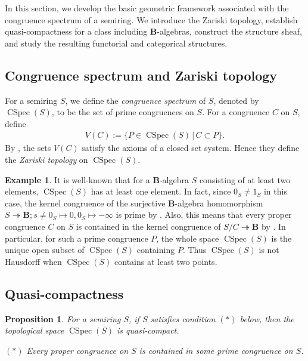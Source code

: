 \documentclass[a4paper,12pt]{amsart}
\theoremstyle{plain}
\newtheorem{proposition}[theorem]{Proposition}
\theoremstyle{definition}
\newtheorem{example}[theorem]{Example}
\begin{document}
In this section, we develop the basic geometric framework associated with the congruence spectrum of a semiring.
We introduce the Zariski topology, establish quasi-compactness for a class including $\boldsymbol{B}$-algebras, construct the structure sheaf, and study the resulting functorial and categorical structures.

\subsection{Congruence spectrum and Zariski topology}
    \label{subsection3.1}

For a semiring $S$, we define the \textit{congruence spectrum} of $S$, denoted by $\operatorname{CSpec}(S)$, to be the set of prime congruences on $S$.
For a congruence $C$ on $S$, define
\begin{align*}
V(C) := \{ P \in \operatorname{CSpec}(S) \,|\, C \subset P \}.    
\end{align*}
By \cite[Proposition 2.4]{Tanaka}, the sets $V(C)$ satisfy the axioms of a closed set system.
Hence they define the \textit{Zariski topology} on $\operatorname{CSpec}(S)$.

\begin{example}
    \label{ex1}
It is well-known that for a $\boldsymbol{B}$-algebra $S$ consisting of at least two elements, $\operatorname{CSpec}(S)$ has at least one element.
In fact, since $0_S \not= 1_S$ in this case, the kernel congruence of the surjective $\boldsymbol{B}$-algebra homomorphism $S \twoheadrightarrow \boldsymbol{B}; s \not= 0_S \mapsto 0, 0_S \mapsto -\infty$ is prime by \cite[Proposition~2.10(ii)]{Joo=Mincheva}.
Also, this means that every proper congruence $C$ on $S$ is contained in the kernel congruence of $S / C \twoheadrightarrow \boldsymbol{B}$ by \cite[Proposition~2.13]{Joo=Mincheva2}.
In particular, for such a prime congruence $P$, the whole space $\operatorname{CSpec}(S)$ is the unique open subset of $\operatorname{CSpec}(S)$ containing $P$.
Thus $\operatorname{CSpec}(S)$ is not Hausdorff when $\operatorname{CSpec}(S)$ contains at least two points.
\end{example}

\subsection{Quasi-compactness}
    \label{subsection3.2}
    
\begin{proposition}
    \label{prop1}
For a semiring $S$, if $S$ satisfies condition $(\ast)$ below, then the topological space $\operatorname{CSpec}(S)$ is quasi-compact.

$(\ast)$ Every proper congruence on $S$ is contained in some prime congruence on $S$.
\end{proposition}
\end{document}
